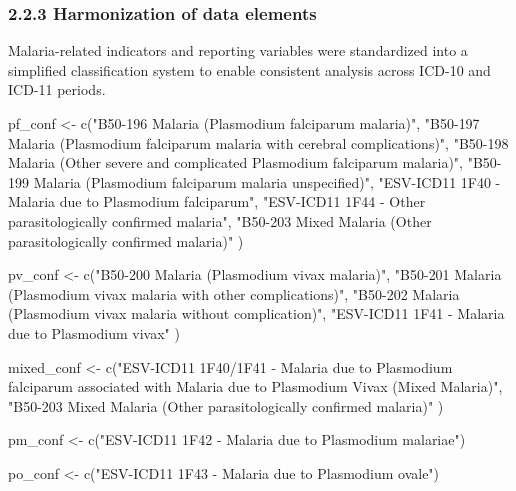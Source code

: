 \documentclass[
  letterpaper,
  DIV=11,
  numbers=noendperiod]{scrartcl}
\newenvironment{Shaded}{\begin{snugshade}}{\end{snugshade}}
\newcommand{\FunctionTok}[1]{\textcolor[rgb]{0.28,0.35,0.67}{#1}}
\newcommand{\NormalTok}[1]{\textcolor[rgb]{0.00,0.23,0.31}{#1}}
\newcommand{\OtherTok}[1]{\textcolor[rgb]{0.00,0.23,0.31}{#1}}
\newcommand{\StringTok}[1]{\textcolor[rgb]{0.13,0.47,0.30}{#1}}
\begin{document}
\subsubsection{2.2.3 Harmonization of data
elements}\label{harmonization-of-data-elements}

Malaria-related indicators and reporting variables were standardized
into a simplified classification system to enable consistent analysis
across ICD-10 and ICD-11 periods.

\begin{Shaded}
\begin{Highlighting}[]
\NormalTok{pf\_conf }\OtherTok{\textless{}{-}} \FunctionTok{c}\NormalTok{(}\StringTok{"B50{-}196 Malaria (Plasmodium falciparum malaria)"}\NormalTok{,}
             \StringTok{"B50{-}197 Malaria (Plasmodium falciparum malaria with cerebral complications)"}\NormalTok{,}
             \StringTok{"B50{-}198 Malaria (Other severe and complicated Plasmodium falciparum malaria)"}\NormalTok{,}
             \StringTok{"B50{-}199 Malaria (Plasmodium falciparum malaria unspecified)"}\NormalTok{,}
             \StringTok{"ESV{-}ICD11 1F40 {-} Malaria due to Plasmodium falciparum"}\NormalTok{,}
             \StringTok{"ESV{-}ICD11 1F44 {-} Other parasitologically confirmed malaria"}\NormalTok{,}
             \StringTok{"B50{-}203 Mixed Malaria (Other parasitologically confirmed malaria)"}
\NormalTok{)}

\NormalTok{pv\_conf }\OtherTok{\textless{}{-}} \FunctionTok{c}\NormalTok{(}\StringTok{"B50{-}200 Malaria (Plasmodium vivax malaria)"}\NormalTok{,}
             \StringTok{"B50{-}201 Malaria (Plasmodium vivax malaria with other complications)"}\NormalTok{,}
             \StringTok{"B50{-}202 Malaria (Plasmodium vivax malaria without complication)"}\NormalTok{,}
             \StringTok{"ESV{-}ICD11 1F41 {-} Malaria due to Plasmodium vivax"}
\NormalTok{)}

\NormalTok{mixed\_conf }\OtherTok{\textless{}{-}} \FunctionTok{c}\NormalTok{(}\StringTok{"ESV{-}ICD11 1F40/1F41 {-}  Malaria due to Plasmodium falciparum associated with Malaria due to Plasmodium Vivax (Mixed Malaria)"}\NormalTok{,}
                \StringTok{"B50{-}203 Mixed Malaria (Other parasitologically confirmed malaria)"}
\NormalTok{)}

\NormalTok{pm\_conf }\OtherTok{\textless{}{-}} \FunctionTok{c}\NormalTok{(}\StringTok{"ESV{-}ICD11 1F42 {-} Malaria due to Plasmodium malariae"}\NormalTok{)}

\NormalTok{po\_conf }\OtherTok{\textless{}{-}} \FunctionTok{c}\NormalTok{(}\StringTok{"ESV{-}ICD11 1F43 {-} Malaria due to Plasmodium ovale"}\NormalTok{)}


\end{Highlighting}
\end{Shaded}
\end{document}
